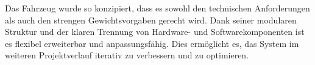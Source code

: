 \documentclass[main.tex]{subfiles} %
\begin{document}
Das Fahrzeug wurde so konzipiert, dass es sowohl den technischen Anforderungen
als auch den strengen Gewichtsvorgaben gerecht wird. Dank seiner modularen
Struktur und der klaren Trennung von Hardware- und Softwarekomponenten ist es
flexibel erweiterbar und anpassungsfähig. Dies ermöglicht es, das System im
weiteren Projektverlauf iterativ zu verbessern und zu optimieren.
\end{document}
